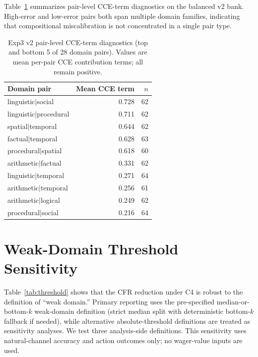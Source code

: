 \documentclass[10pt]{article}
\begin{document}
Table~\ref{tab:exp3-pair-contrib} summarizes pair-level CCE-term diagnostics on
the balanced v2 bank. High-error and low-error pairs both span multiple domain
families, indicating that compositional miscalibration is not concentrated in a
single pair type.

\begin{table}[h]
\centering
\caption{Exp3 v2 pair-level CCE-term diagnostics (top and bottom 5 of 28 domain pairs). Values are mean per-pair CCE contribution terms; all remain positive.}
\label{tab:exp3-pair-contrib}
\small
\begin{tabular}{lrr}
\toprule
Domain pair & Mean CCE term & $n$ \\
\midrule
linguistic$\vert$social & 0.728 & 62 \\
linguistic$\vert$procedural & 0.711 & 62 \\
spatial$\vert$temporal & 0.644 & 62 \\
factual$\vert$temporal & 0.628 & 63 \\
procedural$\vert$spatial & 0.618 & 60 \\
\midrule
arithmetic$\vert$factual & 0.331 & 62 \\
linguistic$\vert$temporal & 0.271 & 64 \\
arithmetic$\vert$temporal & 0.256 & 61 \\
arithmetic$\vert$logical & 0.249 & 62 \\
procedural$\vert$social & 0.216 & 64 \\
\bottomrule
\end{tabular}
\end{table}

\section{Weak-Domain Threshold Sensitivity}
\label{app:threshold}

Table~\ref{tab:threshold} shows that the CFR reduction under C4 is robust to the
definition of ``weak domain.'' Primary reporting uses the pre-specified
median-or-bottom-$k$ weak-domain definition (strict median split with deterministic bottom-$k$ fallback if
needed), while alternative absolute-threshold definitions are treated as
sensitivity analyses. We test three analysis-side definitions. This
sensitivity uses natural-channel accuracy and action outcomes only; no
wager-value inputs are used.
\end{document}

